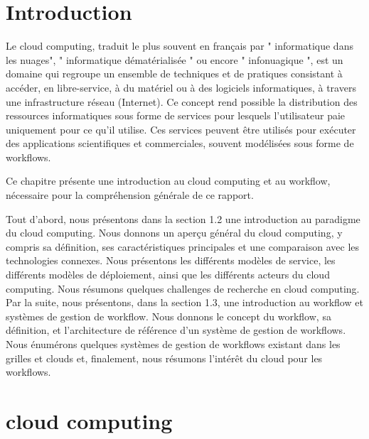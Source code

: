 
  
 	 \section{Introduction}
 	  
    
    Le cloud computing, traduit le plus souvent en français par " informatique dans les nuages", " informatique dématérialisée " ou encore " infonuagique ", est un domaine qui regroupe un ensemble de techniques et de pratiques consistant à accéder, en libre-service, à du matériel ou à des logiciels informatiques, à travers une infrastructure réseau (Internet). Ce concept rend possible la distribution des ressources informatiques sous forme de services pour lesquels l'utilisateur paie uniquement pour ce qu'il utilise. Ces services peuvent être utilisés pour exécuter des applications scientifiques et commerciales, souvent modélisées sous forme de workflows.\parencite[see][p10]{latexcompanion}
     
    Ce chapitre présente une introduction au cloud computing et au workflow, nécessaire pour la compréhension générale de ce rapport.
    
    Tout d’abord, nous présentons dans la section 1.2 une introduction au paradigme du cloud computing. Nous donnons un aperçu général du cloud computing, y compris sa définition, ses caractéristiques principales et une comparaison avec les technologies connexes. Nous présentons les différents modèles de service, les différents modèles de déploiement, ainsi que les différents acteurs du cloud computing. Nous résumons quelques challenges de recherche en cloud computing. Par la suite, nous présentons, dans la section 1.3, une introduction au workflow et systèmes de gestion de workflow. Nous donnons le concept du workflow, sa définition, et l’architecture de référence d’un système de gestion de workflows. Nous énumérons quelques systèmes de gestion de workflows existant dans les grilles et clouds et, finalement, nous résumons l’intérêt  du cloud pour les workflows.
    
    \section{cloud computing}
